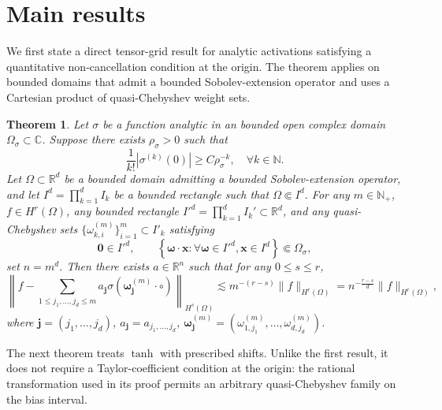 \documentclass{article}
\numberwithin{equation}{section}
\newtheorem{theorem}{Theorem}
\def\NN{\mathbb{N}}
\def\RR{\mathbb{R}}
\def\CC{\mathbb{C}}
\def\lt{\left}
\def\rt{\right}
\def\bomega{{\bm\omega}}
\def\bj{{\bm j}}
\begin{document}
\section{Main results}\label{sec:main-results}
We first state a direct tensor-grid result for analytic activations satisfying a quantitative non-cancellation condition at the origin. The theorem applies on bounded domains that admit a bounded Sobolev-extension operator and uses a Cartesian product of quasi-Chebyshev weight sets. 

\begin{theorem}\label{thm_1d_analytic}
    Let $\sigma$ be a function analytic in an bounded open complex domain $\Omega_\sigma\subset\CC$. Suppose there exists ${\rho_\sigma}>0$ such that
    \begin{equation}\label{eqn:derivative-bound}
        \frac{1}{k!}\lt|\sigma^{(k)}(0)\rt|\geq C \rho_\sigma^{-k},\quad\forall k\in\NN.
    \end{equation}
    Let $\Omega\subset\RR^d$ be a bounded domain admitting a bounded Sobolev-extension operator, and let $I^d=\prod_{k=1}^d I_k$ be a bounded rectangle such that $\Omega\Subset I^d$. For any $m\in\NN_+$, $f\in H^r(\Omega)$, any bounded rectangle $I'^d=\prod_{k=1}^d I_k'\subset \RR^d$, and any quasi-Chebyshev sets $\{\omega_{k,i}^{(m)}\}_{i=1}^m\subset I'_k$ satisfying 
    \begin{equation}\label{eqn:param-bound}
        {\bm 0}\in I'^d,\qquad \lt\{{\bm\omega}\cdot {\bm x}: \forall{\bm\omega}\in I'^d,{\bm x}\in I^d \rt\}\Subset \Omega_\sigma,
    \end{equation}
    set $n=m^d$. Then there exists $a\in\RR^n$ such that for any $0\leq s\leq r$,
    \begin{equation}\label{eqn:1d-analytic-approx}
        \lt\|f - \sum_{1\leq j_1,\ldots,j_d\leq m} a_\bj \sigma(\bomega_\bj^{(m)}\cdot\circ)\rt\|_{H^s(\Omega)}\lesssim m^{-(r-s)} \|f\|_{H^r(\Omega)} = n^{-\frac{r-s}{d}} \|f\|_{H^r(\Omega)},
    \end{equation}
    where $\bj = (j_1,\ldots,j_d)$, $a_\bj = a_{j_1,\ldots,j_d}$, $\bomega_\bj^{(m)} = \lt(\omega_{1,j_1}^{(m)},\ldots,\omega_{d,j_d}^{(m)}\rt)$.
\end{theorem}

The next theorem treats $\tanh$ with prescribed shifts. Unlike the first result, it does not require a Taylor-coefficient condition at the origin: the rational transformation used in its proof permits an arbitrary quasi-Chebyshev family on the bias interval.
\end{document}
